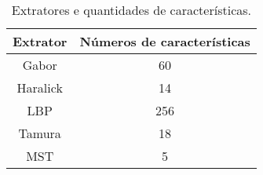 \begin{table}[H]
    \centering
    \caption[Extratores e quantidades de características]{Extratores e quantidades de características.
    \label{tab:extratorXqtdCaracteristicas}}
    \begin{tabular}{cc}
        \toprule
            Extrator & Números de características \\
        \midrule
            Gabor & 60 \\
            Haralick & 14 \\
            LBP & 256 \\
            Tamura & 18 \\
            MST & 5 \\
        \bottomrule
    \end{tabular}
\end{table}

